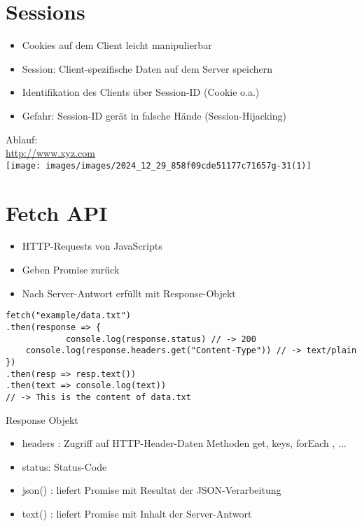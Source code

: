 \section*{Sessions}
\begin{itemize}
  \item Cookies auf dem Client leicht manipulierbar
  \item Session: Client-spezifische Daten auf dem Server speichern
  \item Identifikation des Clients über Session-ID (Cookie o.a.)
  \item Gefahr: Session-ID gerät in falsche Hände (Session-Hijacking)
\end{itemize}

Ablauf:\\
\href{http://www.xyz.com}{http://www.xyz.com}\\
\texttt{[image: images/images/2024\_12\_29\_858f09cde51177c71657g-31(1)]}

\section*{Fetch API}
\begin{itemize}
  \item HTTP-Requests von JavaScripts
  \item Geben Promise zurück
  \item Nach Server-Antwort erfüllt mit Response-Objekt
\end{itemize}

\begin{verbatim}
fetch("example/data.txt")
.then(response => {
            console.log(response.status) // -> 200
    console.log(response.headers.get("Content-Type")) // -> text/plain
})
.then(resp => resp.text())
.then(text => console.log(text))
// -> This is the content of data.txt
\end{verbatim}

Response Objekt

\begin{itemize}
  \item headers : Zugriff auf HTTP-Header-Daten Methoden get, keys, forEach , ...
  \item status: Status-Code
  \item json() : liefert Promise mit Resultat der JSON-Verarbeitung
  \item text() : liefert Promise mit Inhalt der Server-Antwort
\end{itemize}